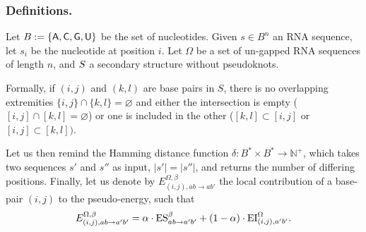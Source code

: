 




\subsubsection{Definitions.}
Let $B:=\left\{{\sf{A}},{\sf{C}},{\sf{G}},{\sf{U}}\right\}$ be the set of nucleotides.
Given $s\in B^n$ an RNA sequence, let $s_i$ be the nucleotide at position $i$. Let $\Omega$ be a set of un-gapped RNA sequences of
length $n$, and $S$ a secondary structure without pseudoknots. 

Formally, if $(i,j)$ and $(k,l)$ are base pairs in $S$, there is no overlapping extremities
 $\{i,j\}\cap \{k,l\}=\varnothing$ and either the intersection is empty 
 ($[i,j]\cap[k,l]=\varnothing$) or one is included in the other ($[k,l]\subset[i,j]$ or 
 $[i,j]\subset[k,l])$. 


Let us then remind the Hamming distance function $\delta: B^*\times B^* \to \mathbb{N}^+$, which takes two sequences $s'$ and $s''$ as input, $|s'|=|s''|$, and returns the number of differing positions.
Finally, let us denote by $E_{(i,j),ab \to ab'}^{\Omega,\beta}$ the local contribution of a base-pair $(i,j)$ to the pseudo-energy, such that
\begin{equation}
  E_{(i,j),ab \to a'b'}^{\Omega,\beta}  = \alpha \cdot\text{ES}^\beta_{a b \to a' b'}+(1-\alpha)\cdot\text{EI}^{\Omega}_{(i,j),a'b'}.
\end{equation}
